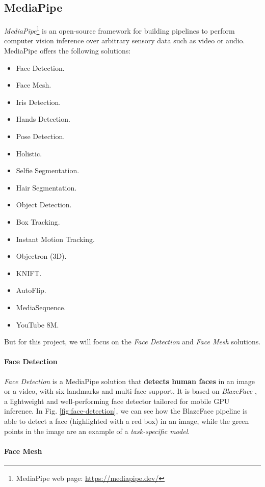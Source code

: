 \documentclass[preprint]{elsarticle}
\begin{document}
\subsection{MediaPipe}
\emph{MediaPipe}\footnote{MediaPipe web page: \url{https://mediapipe.dev/}} 
is an open-source framework for building pipelines to perform computer vision 
inference over arbitrary sensory data such as video or audio.
MediaPipe offers the following solutions:
\begin{itemize}
	\item Face Detection.
	\item Face Mesh.
	\item Iris Detection.
	\item Hands Detection.
	\item Pose Detection.
	\item Holistic.
	\item Selfie Segmentation.
	\item Hair Segmentation.
	\item Object Detection.
	\item Box Tracking.
	\item Instant Motion Tracking.
	\item Objectron (3D).
	\item KNIFT.
	\item AutoFlip.
	\item MediaSequence.
	\item YouTube 8M.
\end{itemize}
But for this project, we will focus on the \emph{Face Detection} and \emph{Face Mesh} solutions.

\paragraph{Face Detection}


\emph{Face Detection} is a MediaPipe solution that \textbf{detects human faces} in an image or a video,
with six landmarks and multi-face support.
It is based on \emph{BlazeFace} \cite{bazarevsky2019blazeface}, a lightweight and well-performing 
face detector tailored for mobile GPU inference.
In Fig. \ref{fig:face-detection}, we can see how the BlazeFace pipeline is able to detect a face 
(highlighted with a red box) in an image, while the green points in the image are an example of a
\emph{task-specific model}.

\paragraph{Face Mesh}
\end{document}
